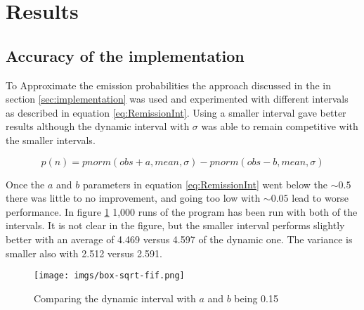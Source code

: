 \documentclass[12pt, a4paper]{article}
\begin{document}


\section{Results}

\subsection{Accuracy of the implementation}

To Approximate the emission probabilities the approach discussed in the in section \ref{sec:implementation} was used and experimented with different intervals as described in equation \ref{eq:RemissionInt}. Using a smaller interval gave better results although the dynamic interval with $\sigma$ was able to remain competitive with the smaller intervals.

\begin{equation}\label{eq:RemissionInt}
p(n) = pnorm(obs+a,mean,\sigma)-pnorm(obs-b,mean,\sigma)
\end{equation}

Once the $a$ and $b$ parameters in equation \ref{eq:RemissionInt} went below the $\sim0.5$ there was little to no improvement, and going too low with $\sim0.05$ lead to worse performance. In figure \ref{fig:box-sqrt-fif.png} 1,000 runs of the program has been run with both of the intervals. It is not clear in the figure, but the smaller interval performs slightly better with an average of 4.469 versus 4.597 of the dynamic one. The variance is smaller also with 2.512 versus 2.591. 

\begin{figure}[!ht]\label{fig:box-sqrt-fif.png}
\centering
\texttt{[image: imgs/box-sqrt-fif.png]}\\
\caption{Comparing the dynamic interval with $a$ and $b$ being 0.15}
\end{figure}
\end{document}
